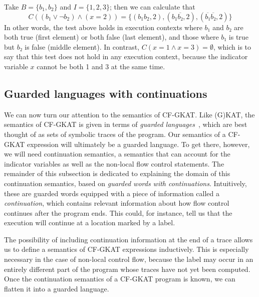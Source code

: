 \begin{example}
 Take $B = \{ b_1, b_2 \}$ and $I = \{ 1, 2, 3 \}$; then we can calculate that
 \[
  C( (b_1 ∨ ¬ b_2) ∧ (x = 2) ) = \{
  (b_1 b_2, 2),
  (b_1 \overline{b₂}, 2),
  (\overline{b₁} \overline{b₂}, 2)
  \}
 \]
 In other words, the test above holds in execution contexts where $b₁$ and $b₂$ are both true (first element) or both false (last element), and those where $b₁$ is true but $b₂$ is false (middle element).
 In contrast, $C( x = 1 ∧ x = 3) = ∅$, which is to say that this test does not hold in any execution context, because the indicator variable \(x\) cannot be both 1 and 3 at the same time.
\end{example}

\subsection{Guarded languages with continuations}\label{sec:continuation-semantics}

We can now turn our attention to the semantics of CF-GKAT\@.
Like (G)KAT, the semantics of CF-GKAT is given in terms of \emph{guarded languages}~\cite{Schmid_Kappé_Kozen_Silva_2021,Kozen_1997}, which are best thought of as sets of symbolic traces of the program.
Our semantics of a CF-GKAT expression will ultimately be a guarded language.
To get there, however, we will need continuation semantics, a semantics that can account for the indicator variables as well as the non-local flow control statements.
The remainder of this subsection is dedicated to explaining the domain of this continuation semantics, based on \emph{guarded words with continuations}.
Intuitively, these are guarded words equipped with a piece of information called a \emph{continuation}, which contains relevant information about how flow control continues after the program ends.
This could, for instance, tell us that the execution will continue at a location marked by a label.

The possibility of including continuation information at the end of a trace allows us to define a semantics of CF-GKAT expressions inductively.
This is especially necessary in the case of non-local control flow, because the label may occur in an entirely different part of the program whose traces have not yet been computed.
Once the continuation semantics of a CF-GKAT program is known, we can flatten it into a guarded language.

